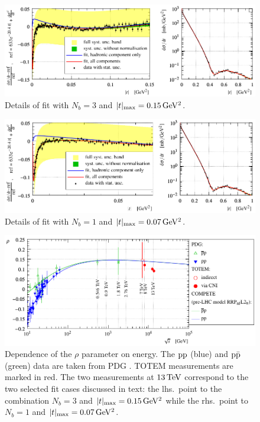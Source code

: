 \begin{figure}
\vskip-5mm
\begin{center}
\includegraphics{fig/fit_details_exp3_0p15.pdf}
\caption{%
Details of fit with $N_b = 3$ and $|t|_{\rm max} = 0.15\,{\rm GeV^2}$.
}
\label{fig:fit exp3 0.15}
\end{center}
\end{figure}


\begin{figure}
\vskip-5mm
\begin{center}
\includegraphics{fig/fit_details_exp1_0p07.pdf}
\caption{%
Details of fit with $N_b = 1$ and $|t|_{\rm max} = 0.07\,{\rm GeV^2}$.
}
\label{fig:fit exp1 0.07}
\end{center}
\end{figure}

\begin{figure}
\vskip-5mm
\begin{center}
\includegraphics{fig/rho_vs_s.pdf}
\caption{%
Dependence of the $\rho$ parameter on energy. The $\rm pp$ (blue) and $\rm p\bar p$ (green) data are taken from PDG \cite{pdg}. TOTEM measurements are marked in red. The two measurements at $13\,{\rm TeV}$ correspond to the two selected fit cases discussed in text: the lhs.~point to the combination $N_b = 3$ and $|t|_{\rm max} = 0.15\,{\rm GeV^2}$ while the rhs.~point to $N_b = 1$ and $|t|_{\rm max} = 0.07\,{\rm GeV^2}$.
}
\label{fig:rho_vs_s}
\end{center}
\end{figure}


